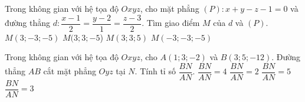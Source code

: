 \begin{ex}%
Trong không gian với hệ tọa độ $Oxyz$, cho mặt phẳng $(P): x+y-z-1=0$ và đường thẳng $d:\dfrac{x-1}{2}=\dfrac{y-2}{1}=\dfrac{z-3}{2}$. Tìm giao điểm $M$ của $d$ và $(P)$.
\choice 
{$M(3;-3;-5)$}
{$M(3;3;-5$)}
{\True $M(3;3;5)$}
{$M(-3;-3;-5)$}  
\end{ex} 

\begin{ex}%
Trong không gian với hệ tọa độ $Oxyz$, cho $A(1;3;-2)$ và $B(3;5;-12)$. Đường thẳng $AB$ cắt mặt phẳng $Oyz$ tại $N$. Tính tỉ số $\dfrac{BN}{AN}$.
\choice 
{$\dfrac{BN}{AN}=4$}
{$\dfrac{BN}{AN}=2$}
{$\dfrac{BN}{AN}=5$}
{\True $\dfrac{BN}{AN}=3$}  
\end{ex} 

